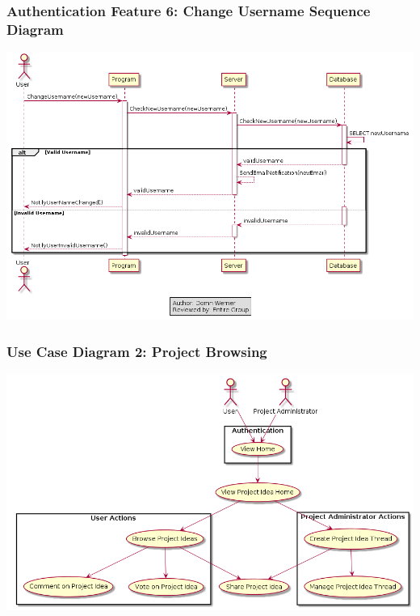 \documentclass[twoside,letterpaper]{article}
\begin{document}
\subsubsection[Authentication Feature 6: Change Username Sequence Diagram]{\rmfamily\bfseries\color{black}
	Authentication Feature 6: Change Username Sequence Diagram}
\hypertarget{RefHeading22059017292}{}

\bigskip

\includegraphics[width=\textwidth]{images/SequenceDiagrams/AuthenticationChangeUsername}

\newpage

\subsubsection[Use Case Diagram 2: Project Browsing]{\rmfamily\bfseries\color{black}
Use Case Diagram 2: Project Browsing}

\includegraphics[width=\textwidth]{images/UseCaseDiagrams/ProjectBrowsing}
\end{document}
